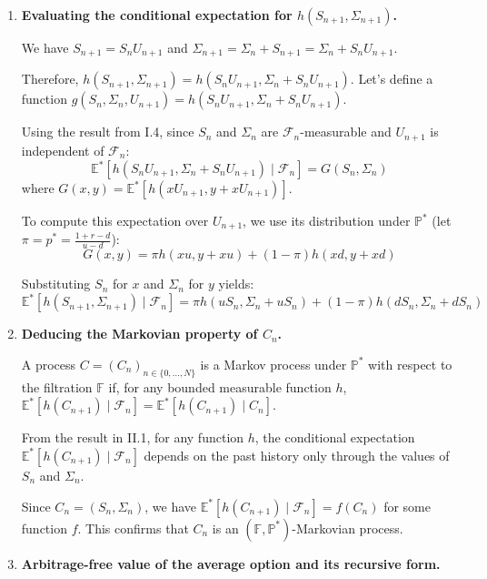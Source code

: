 \begin{enumerate}
      \item \textbf{Evaluating the conditional expectation for $h(S_{n+1}, \Sigma_{n+1})$.}

            We have $S_{n+1} = S_n U_{n+1}$ and $\Sigma_{n+1} = \Sigma_n + S_{n+1} = \Sigma_n + S_n U_{n+1}$.

            Therefore, $h(S_{n+1}, \Sigma_{n+1}) = h(S_n U_{n+1}, \Sigma_n + S_n U_{n+1})$.
            Let's define a function $g(S_n, \Sigma_n, U_{n+1}) = h(S_n U_{n+1}, \Sigma_n + S_n U_{n+1})$.

            Using the result from I.4, since $S_n$ and $\Sigma_n$ are $\mathcal{F}_n$-measurable and $U_{n+1}$ is independent of $\mathcal{F}_n$:
            \[ \mathbb{E}^*[h(S_n U_{n+1}, \Sigma_n + S_n U_{n+1}) \mid \mathcal{F}_n] = G(S_n, \Sigma_n) \]
            where $G(x, y) = \mathbb{E}^*[h(x U_{n+1}, y + x U_{n+1})]$.

            To compute this expectation over $U_{n+1}$, we use its distribution under $\mathbb{P}^*$ (let $\pi = p^* = \frac{1+r-d}{u-d}$):
            \[ G(x, y) = \pi h(x u, y + x u) + (1 - \pi) h(x d, y + x d) \]

            Substituting $S_n$ for $x$ and $\Sigma_n$ for $y$ yields:
            \[ \mathbb{E}^*[h(S_{n+1}, \Sigma_{n+1}) \mid \mathcal{F}_n] = \pi h(u S_n, \Sigma_n + u S_n) + (1 - \pi) h(d S_n, \Sigma_n + d S_n) \]

      \item \textbf{Deducing the Markovian property of $C_n$.}

            A process $C = (C_n)_{n \in \{0, \dots, N\}}$ is a Markov process under $\mathbb{P}^*$ with respect to the filtration $\mathbb{F}$ if, for any bounded measurable function $h$, $\mathbb{E}^*[h(C_{n+1}) \mid \mathcal{F}_n] = \mathbb{E}^*[h(C_{n+1}) \mid C_n]$.

            From the result in II.1, for any function $h$, the conditional expectation $\mathbb{E}^*[h(C_{n+1}) \mid \mathcal{F}_n]$ depends on the past history only through the values of $S_n$ and $\Sigma_n$.

            Since $C_n = (S_n, \Sigma_n)$, we have $\mathbb{E}^*[h(C_{n+1}) \mid \mathcal{F}_n] = f(C_n)$ for some function $f$. This confirms that $C_n$ is an $(\mathbb{F}, \mathbb{P}^*)$-Markovian process.

      \item \textbf{Arbitrage-free value of the average option and its recursive form.}


\end{enumerate}

